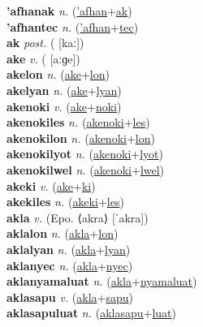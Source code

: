 \textbf{'afhanak} \textit{n.} (\hyperref['afhan]{'afhan}+\hyperref[ak]{ak})
 \label{'afhanak} \\
\textbf{'afhantec} \textit{n.} (\hyperref['afhan]{'afhan}+\hyperref[tec]{tec})
 \label{'afhantec} \\
\textbf{ak} \textit{post.} ( [kaː])
 \label{ak} \\
\textbf{ake} \textit{v.} ( [aːɡe])
 \label{ake} \\
\textbf{akelon} \textit{n.} (\hyperref[ake]{ake}+\hyperref[lon]{lon})
 \label{akelon} \\
\textbf{akelyan} \textit{n.} (\hyperref[ake]{ake}+\hyperref[lyan]{lyan})
 \label{akelyan} \\
\textbf{akenoki} \textit{v.} (\hyperref[ake]{ake}+\hyperref[noki]{noki})
 \label{akenoki} \\
\textbf{akenokiles} \textit{n.} (\hyperref[akenoki]{akenoki}+\hyperref[les]{les})
 \label{akenokiles} \\
\textbf{akenokilon} \textit{n.} (\hyperref[akenoki]{akenoki}+\hyperref[lon]{lon})
 \label{akenokilon} \\
\textbf{akenokilyot} \textit{n.} (\hyperref[akenoki]{akenoki}+\hyperref[lyot]{lyot})
 \label{akenokilyot} \\
\textbf{akenokilwel} \textit{n.} (\hyperref[akenoki]{akenoki}+\hyperref[lwel]{lwel})
 \label{akenokilwel} \\
\textbf{akeki} \textit{v.} (\hyperref[ake]{ake}+\hyperref[ki]{ki})
 \label{akeki} \\
\textbf{akekiles} \textit{n.} (\hyperref[akeki]{akeki}+\hyperref[les]{les})
 \label{akekiles} \\
\textbf{akla} \textit{v.} (Epo. ⟨akra⟩ [ˈakra])
 \label{akla} \\
\textbf{aklalon} \textit{n.} (\hyperref[akla]{akla}+\hyperref[lon]{lon})
 \label{aklalon} \\
\textbf{aklalyan} \textit{n.} (\hyperref[akla]{akla}+\hyperref[lyan]{lyan})
 \label{aklalyan} \\
\textbf{aklanyec} \textit{n.} (\hyperref[akla]{akla}+\hyperref[nyec]{nyec})
 \label{aklanyec} \\
\textbf{aklanyamaluat} \textit{n.} (\hyperref[akla]{akla}+\hyperref[nyamaluat]{nyamaluat})
 \label{aklanyamaluat} \\
\textbf{aklasapu} \textit{v.} (\hyperref[akla]{akla}+\hyperref[sapu]{sapu})
 \label{aklasapu} \\
\textbf{aklasapuluat} \textit{n.} (\hyperref[aklasapu]{aklasapu}+\hyperref[luat]{luat})
